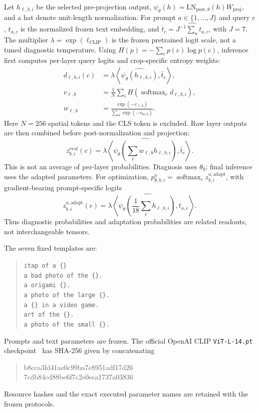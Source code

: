 Let $h_{\ell,b,i}$ be the selected pre-projection output, $\psi_\theta(h)=\mathrm{LN}_{\mathrm{post},\theta}(h)W_{\mathrm{proj}}$, and a hat denote unit-length normalization. For prompt $a\in\{1,\ldots,J\}$ and query $c$, $t_{a,c}$ is the normalized frozen text embedding, and $\bar t_c=\widehat{J^{-1}\sum_at_{a,c}}$, with $J=7$. The multiplier $\lambda=\exp(\ell_{\mathrm{CLIP}})$ is the frozen pretrained logit scale, not a tuned diagnostic temperature. Using $H(p)=-\sum_cp(c)\log p(c)$, inference first computes per-layer query logits and crop-specific entropy weights:
\begin{align}
d_{\ell,b,i}(c)&=\lambda\left\langle
\widehat{\psi_\theta(h_{\ell,b,i})},\bar t_c\right\rangle,\\
v_{\ell,b}&=\frac1N\sum_iH\!\left(
\operatorname{softmax}_c d_{\ell,b,i}\right),\\
w_{\ell,b}&=\frac{\exp(-v_{\ell,b})}{\sum_m\exp(-v_{m,b})}.
\end{align}
Here $N=256$ spatial tokens and the CLS token is excluded. Raw layer outputs are then combined before post-normalization and projection:
\begin{equation}
z^{\mathrm{eval}}_{b,i}(c)=\lambda\left\langle
\widehat{\psi_\theta\!\left(\sum_\ell w_{\ell,b}h_{\ell,b,i}\right)},
\bar t_c\right\rangle.
\end{equation}
This is not an average of per-layer probabilities. Diagnosis uses $\theta_0$; final inference uses the adapted parameters. For optimization, $p^a_{\theta,b,i}=\operatorname{softmax}_c z^{a,\mathrm{adapt}}_{b,i}$, with gradient-bearing prompt-specific logits
\begin{equation}
z^{a,\mathrm{adapt}}_{b,i}(c)=\lambda\left\langle
\widehat{\psi_\theta\!\left(\frac1{18}\sum_\ell h_{\ell,b,i}\right)},
t_{a,c}\right\rangle.
\end{equation}
Thus diagnostic probabilities and adaptation probabilities are related readouts, not interchangeable tensors.

The seven fixed templates are:
\begin{quote}\small
\texttt{itap of a \{\}}\\
\texttt{a bad photo of the \{\}.}\\
\texttt{a origami \{\}.}\\
\texttt{a photo of the large \{\}.}\\
\texttt{a \{\} in a video game.}\\
\texttt{art of the \{\}.}\\
\texttt{a photo of the small \{\}.}
\end{quote}
Prompts and text parameters are frozen. The official OpenAI CLIP \texttt{ViT-L-14.pt} checkpoint~\cite{radford2021clip} has SHA-256 given by concatenating
\begin{quote}\small\ttfamily
b8cca3fd41ae0c99ba7e8951adf17d26\\
7cdb84cd88be6f7c2e0eca1737a03836
\end{quote}
Resource hashes and the exact executed parameter names are retained with the frozen protocols.

